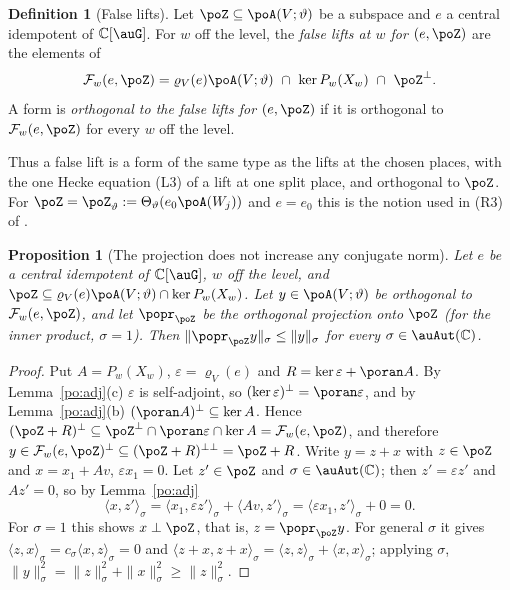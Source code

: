 \documentclass[10pt]{amsart}
\newtheorem{proposition}[theorem]{Proposition}
\theoremstyle{definition}
\newtheorem{definition}[theorem]{Definition}
\theoremstyle{remark}
\newcommand{\C}{\mathbb C}
\begin{document}
\begin{definition}[False lifts]\label{po:false}
Let $\poZ\subseteq\poA(V;\vartheta)$ be a subspace and $e$ a central idempotent of $\C[\auG]$. For
$w$ off the level, the \emph{false lifts at $w$ for $(e,\poZ)$} are the elements of
\[
\mathcal F_w(e,\poZ)=\varrho_V(e)\poA(V;\vartheta)\ \cap\ \ker P_w(X_w)\ \cap\ \poZ^\perp .
\]
A form is \emph{orthogonal to the false lifts for $(e,\poZ)$} if it is orthogonal to
$\mathcal F_w(e,\poZ)$ for every $w$ off the level.
\end{definition}

Thus a false lift is a form of the same type as the lifts at the chosen places, with the one
Hecke equation (L3) of a lift at one split place, and orthogonal to $\poZ$. For
$\poZ=\poZ_\vartheta:=\Theta_\vartheta(e_0\poA(W_j))$ and $e=e_0$ this is the notion used in
(R3) of {\cite[Definition~14.39]{P46}}.

\begin{proposition}[The projection does not increase any conjugate norm]\label{po:proj}
Let $e$ be a central idempotent of $\C[\auG]$, $w$ off the level, and $\poZ\subseteq\varrho_V(e)
\poA(V;\vartheta)\cap\ker P_w(X_w)$. Let $y\in\poA(V;\vartheta)$ be orthogonal to
$\mathcal F_w(e,\poZ)$, and let $\popr_\poZ$ be the orthogonal projection onto $\poZ$ (for the inner
product, $\sigma=1$). Then $\|\popr_\poZ y\|_\sigma\le\|y\|_\sigma$ for every $\sigma\in\auAut(\C)$.
\end{proposition}
\begin{proof}
Put $A=P_w(X_w)$, $\varepsilon=\varrho_V(e)$ and $R=\ker\varepsilon+\poran A$. By
Lemma~\ref{po:adj}(c) $\varepsilon$ is self-adjoint, so $(\ker\varepsilon)^\perp=\poran\varepsilon$,
and by Lemma~\ref{po:adj}(b) $(\poran A)^\perp\subseteq\ker A$. Hence
$(\poZ+R)^\perp\subseteq\poZ^\perp\cap\poran\varepsilon\cap\ker A=\mathcal F_w(e,\poZ)$, and
therefore $y\in\mathcal F_w(e,\poZ)^\perp\subseteq(\poZ+R)^{\perp\perp}=\poZ+R$. Write $y=z+x$ with
$z\in\poZ$ and $x=x_1+Av$, $\varepsilon x_1=0$. Let $z'\in\poZ$ and $\sigma\in\auAut(\C)$; then
$z'=\varepsilon z'$ and $Az'=0$, so by Lemma~\ref{po:adj}
\[
\langle x,z'\rangle_\sigma=\langle x_1,\varepsilon z'\rangle_\sigma+\langle Av,z'\rangle_\sigma=
\langle\varepsilon x_1,z'\rangle_\sigma+0=0 .
\]
For $\sigma=1$ this shows $x\perp\poZ$, that is, $z=\popr_\poZ y$. For general $\sigma$ it gives
$\langle z,x\rangle_\sigma=c_\sigma\langle x,z\rangle_\sigma=0$ and
$\langle z+x,z+x\rangle_\sigma=\langle z,z\rangle_\sigma+\langle x,x\rangle_\sigma$; applying
$\sigma$, $\|y\|_\sigma^2=\|z\|_\sigma^2+\|x\|_\sigma^2\ge\|z\|_\sigma^2$.
\end{proof}
\end{document}
